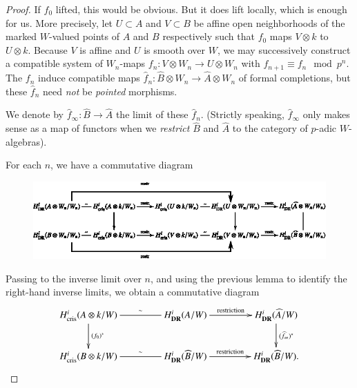 \begin{proof}
If $f_{0}$ lifted, this would be obvious. But it does lift locally, which is enough for us. More precisely, let $U\subset A$ and $V\subset B$ be affine open neighborhoods of the marked $W$-valued points of $A$ and $B$ respectively such that $f_{0}$ maps $V\otimes k$ to $U\otimes k$. Because $V$ is affine and $U$ is smooth over $W$, we may successively construct a compatible system of $W_{n}$-maps $f_{n}:V\otimes W_{n}\to U\otimes W_{n}$ with $f_{n+1}\equiv f_{n}\mod p^{n}$. The $f_{n}$ induce compatible maps $\widehat{f}_{n}:\widehat{B}\otimes W_{n}\to \widehat{A}\otimes W_{n}$ of formal completions, but these $\widehat{f}_{n}$ need {\em not} be {\em pointed} morphisms.

We denote by $\widehat{f}_{\infty}:\widehat{B}\to \widehat{A}$ the limit of these $\widehat{f}_{n}$. (Strictly speaking, $\widehat{f}_{\infty}$ only makes sense as a map of functors when we {\em restrict} $\widehat{B}$ and $\widehat{A}$ to the category of $p$-adic $W$-algebras).

For each $n$, we have a commutative diagram
\begin{figure}[H]
\centering
\includegraphics[scale=1.15]{chap6/fig10.eps}
\end{figure}

Passing to the inverse limit over $n$, and using the previous lemma to identify the right-hand inverse limits, we obtain a commutative diagram
\[
\xymatrix@C=1.5cm{
H^{i}_{\text{cris}}(A\otimes k/W)\ar[d]^{(f_{0})^{*}}\ar@{-}[r]^-{\sim} & H^{i}_{\DR}(A/W)\ar[r]^-{\text{restriction}} & H^{i}_{\DR}(\widehat{A}/W)\ar[d]^-{(\widehat{f}_{\infty})^{*}}\\
H^{i}_{\text{cris}}(B\otimes k/W)\ar@{-}[r]^-{\sim} & H^{i}_{\DR}(\widehat{B}/W)\ar[r]^-{\text{restriction}} & H^{i}_{\DR}(\widehat{B}/W).
}
\]


\end{proof}

